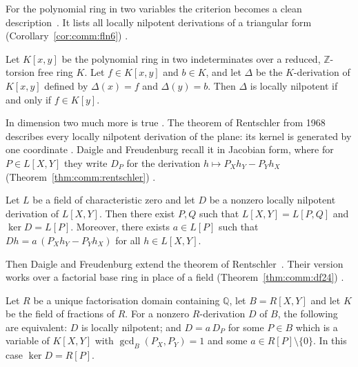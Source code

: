 For the polynomial ring in two variables the criterion becomes a clean
description~\cite[Corollary~6, p.~49]{FerreroLequainNowicki1992}. It lists all locally nilpotent derivations of a triangular form (Corollary~\ref{cor:comm:fln6})
\cite[Corollary~6, p.~49]{FerreroLequainNowicki1992}.\begin{corollary}\label{cor:comm:fln6}
Let $K[x, y]$ be the polynomial ring in two indeterminates over a reduced,
$\mathbb{Z}$-torsion free ring $K$. Let $f \in K[x, y]$ and $b \in K$, and
let $\Delta$ be the $K$-derivation of $K[x, y]$ defined by $\Delta(x) = f$
and $\Delta(y) = b$. Then $\Delta$ is locally nilpotent if and only if
$f \in K[y]$.
\end{corollary}

In dimension two much more is true
\cite[pp.~356--357]{DaigleFreudenburg1998UFD}. The theorem of Rentschler from
1968 describes every locally nilpotent derivation of the plane: its kernel is
generated by one coordinate
\cite[pp.~356--357]{DaigleFreudenburg1998UFD}. Daigle and Freudenburg recall
it in Jacobian form, where for $P\in L[X,Y]$ they write $D_P$ for the
derivation $h \mapsto P_X h_Y - P_Y h_X$ (Theorem~\ref{thm:comm:rentschler})
\cite[pp.~356--357]{DaigleFreudenburg1998UFD}.\begin{theorem}\label{thm:comm:rentschler}
Let $L$ be a field of characteristic zero and let $D$ be a nonzero locally
nilpotent derivation of $L[X, Y]$. Then there exist $P, Q$ such that
$L[X, Y] = L[P, Q]$ and $\ker D = L[P]$. Moreover, there exists $a\in L[P]$
such that $D h = a\,(P_X h_Y - P_Y h_X)$ for all $h \in L[X, Y]$.
\end{theorem}

Then Daigle and Freudenburg extend the theorem of Rentschler~\cite[Theorem~2.4, pp.~358--359]{DaigleFreudenburg1998UFD}. Their version
works over a factorial base ring in place of a field (Theorem~\ref{thm:comm:df24})
\cite[Theorem~2.4, pp.~358--359]{DaigleFreudenburg1998UFD}.\begin{theorem}\label{thm:comm:df24}
Let $R$ be a unique factorisation domain containing $\mathbb{Q}$, let
$B = R[X, Y]$ and let $K$ be the field of fractions of $R$. For a nonzero
$R$-derivation $D$ of $B$, the following are equivalent: $D$ is locally
nilpotent; and $D = a\,D_P$ for some $P \in B$ which is a variable of
$K[X, Y]$ with $\gcd_B(P_X, P_Y) = 1$ and some
$a \in R[P]\setminus\{0\}$. In this case $\ker D = R[P]$.
\end{theorem}

